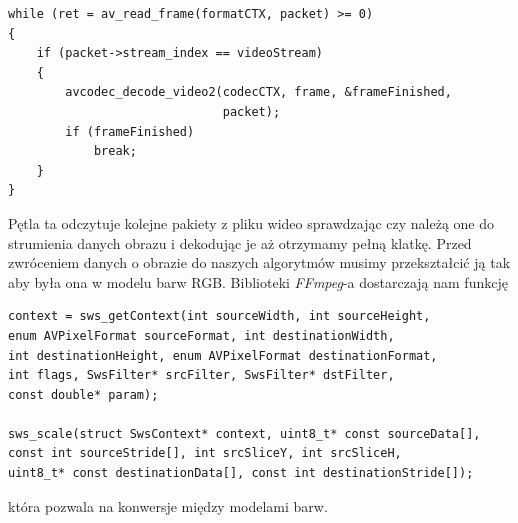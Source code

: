 \documentclass[twoside]{projektInzynierskiMS}
\begin{document}
\begin{verbatim}
while (ret = av_read_frame(formatCTX, packet) >= 0) 
{
    if (packet->stream_index == videoStream) 
    {
        avcodec_decode_video2(codecCTX, frame, &frameFinished, 
                              packet);
        if (frameFinished)
            break;
    }
}
\end{verbatim}
Pętla ta odczytuje kolejne pakiety z pliku wideo sprawdzając czy należą one do strumienia danych obrazu i dekodując je aż otrzymamy pełną klatkę. Przed zwróceniem danych o obrazie do naszych algorytmów musimy przekształcić ją tak aby była ona w modelu barw RGB. Biblioteki \emph{FFmpeg}-a dostarczają nam funkcję
\begin{verbatim}
context = sws_getContext(int sourceWidth, int sourceHeight, 
enum AVPixelFormat sourceFormat, int destinationWidth, 
int destinationHeight, enum AVPixelFormat destinationFormat, 
int flags, SwsFilter* srcFilter, SwsFilter* dstFilter, 
const double* param);

sws_scale(struct SwsContext* context, uint8_t* const sourceData[], 
const int sourceStride[], int srcSliceY, int srcSliceH, 
uint8_t* const destinationData[], const int destinationStride[]);
\end{verbatim}
która pozwala na konwersje między modelami barw.
\end{document}
